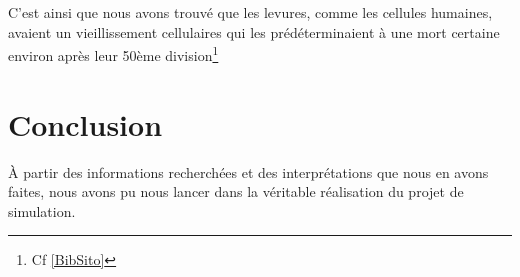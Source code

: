   C'est ainsi que nous avons trouvé que les levures, comme les cellules humaines, avaient un vieillissement cellulaires qui les prédéterminaient à une mort certaine environ après leur 50ème division\footnote{Cf \ref{BibSito}}
  
\section*{Conclusion}
  À partir des informations recherchées et des interprétations que nous en avons faites, nous avons pu nous lancer dans la véritable réalisation du projet de simulation.
